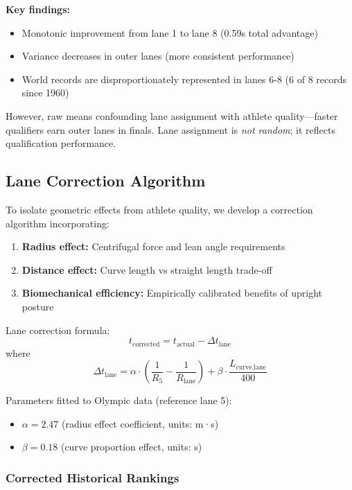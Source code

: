 \textbf{Key findings:}
\begin{itemize}
    \item Monotonic improvement from lane 1 to lane 8 (0.59s total advantage)
    \item Variance decreases in outer lanes (more consistent performance)
    \item World records are disproportionately represented in lanes 6-8 (6 of 8 records since 1960)
\end{itemize}

However, raw means confounding lane assignment with athlete quality—faster qualifiers earn outer lanes in finals. Lane assignment is \textit{not random}; it reflects qualification performance.

\subsection{Lane Correction Algorithm}

To isolate geometric effects from athlete quality, we develop a correction algorithm incorporating:
\begin{enumerate}
    \item \textbf{Radius effect:} Centrifugal force and lean angle requirements
    \item \textbf{Distance effect:} Curve length vs straight length trade-off
    \item \textbf{Biomechanical efficiency:} Empirically calibrated benefits of upright posture
\end{enumerate}

Lane correction formula:
\begin{equation}
t_{\text{corrected}} = t_{\text{actual}} - \Delta t_{\text{lane}}
\end{equation}
where
\begin{equation}
\Delta t_{\text{lane}} = \alpha \cdot \left(\frac{1}{R_5} - \frac{1}{R_{\text{lane}}}\right) + \beta \cdot \frac{L_{\text{curve,lane}}}{400}
\end{equation}

Parameters fitted to Olympic data (reference lane 5):
\begin{itemize}
    \item $\alpha = 2.47$ (radius effect coefficient, units: m·s)
    \item $\beta = 0.18$ (curve proportion effect, units: s)
\end{itemize}

\subsubsection{Corrected Historical Rankings}

